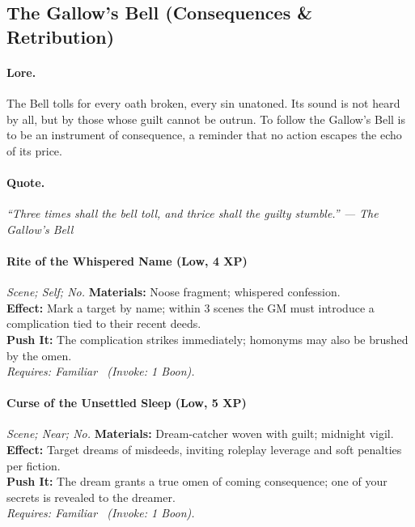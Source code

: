 \subsection{The Gallow's Bell (Consequences \& Retribution)}

\paragraph{Lore.}
The Bell tolls for every oath broken, every sin unatoned. Its sound is not heard by all, but by those whose guilt cannot be outrun. To follow the Gallow’s Bell is to be an instrument of consequence, a reminder that no action escapes the echo of its price.

\paragraph{Quote.}
\emph{“Three times shall the bell toll, and thrice shall the guilty stumble.” — The Gallow’s Bell}

\paragraph{Rite of the Whispered Name (Low, 4 XP)} \emph{Scene; Self; No.}
\textbf{Materials:} Noose fragment; whispered confession. \\
\textbf{Effect:} Mark a target by name; within 3 scenes the GM must introduce a complication tied to their recent deeds. \\
\textbf{Push It:} The complication strikes immediately; homonyms may also be brushed by the omen. \\
\emph{Requires: Familiar \ (\textit{Invoke:} 1 Boon).}

\paragraph{Curse of the Unsettled Sleep (Low, 5 XP)} \emph{Scene; Near; No.}
\textbf{Materials:} Dream-catcher woven with guilt; midnight vigil. \\
\textbf{Effect:} Target dreams of misdeeds, inviting roleplay leverage and soft penalties per fiction. \\
\textbf{Push It:} The dream grants a true omen of coming consequence; one of your secrets is revealed to the dreamer. \\
\emph{Requires: Familiar \ (\textit{Invoke:} 1 Boon).}

